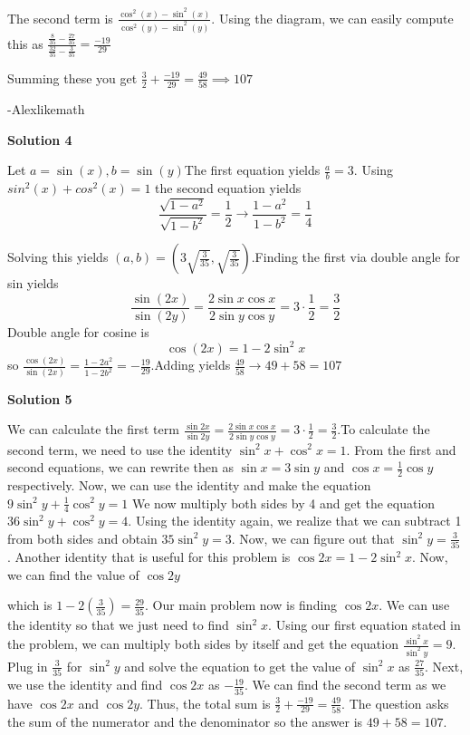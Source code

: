 \begin{enumerate}
 The second term is $\frac{\cos^2(x) - \sin^2(x)}{\cos^2(y) - \sin^2(y)}$. Using the diagram, we can easily compute this as $\frac{\frac{8}{35} - \frac{27}{35}}{\frac{32}{35} - \frac{3}{35}} = \frac{-19}{29}$

 Summing these you get $\frac{3}{2} + \frac{-19}{29} = \frac{49}{58} \implies \boxed{107}$

 -Alexlikemath

 



\textbf{Solution 4}

Let $a = \sin(x), b = \sin(y)$The first equation yields $\frac{a}{b} = 3.$ Using $sin^2(x) + cos^2(x) = 1$ the second equation yields 
 \[\frac{\sqrt{1-a^2}}{\sqrt{1-b^2}} = \frac{1}{2} \rightarrow \frac{1-a^2}{1-b^2} = \frac{1}{4}\]

 Solving this yields $\left(a, b\right) = \left(3\sqrt{\frac{3}{35}},\sqrt{\frac{3}{35}}\right).$Finding the first via double angle for sin yields
 \[\frac{\sin(2x)}{\sin(2y)} = \frac{2\sin{x}\cos{x}}{2\sin{y}\cos{y}} = 3 \cdot \frac{1}{2} = \frac{3}{2}\]Double angle for cosine is 
 \[\cos(2x) = 1-2\sin^2{x}\]so $\frac{\cos(2x)}{\sin(2x)} = \frac{1-2a^2}{1-2b^2} = -\frac{19}{29}.$Adding yields $\frac{49}{58} \rightarrow 49 + 58 = \boxed{107}$




\textbf{Solution 5}

We can calculate the first term $\frac{\sin 2x}{\sin 2y} = \frac{2 \sin x \cos x}{2 \sin y \cos y} = 3 \cdot \frac{1}{2} = \frac{3}{2}.$To calculate the second term, we need to use the identity $\sin^2 x + \cos^2 x = 1.$ From the first and second equations, we can rewrite then as $\sin x = 3 \sin y$ and $\cos x = \frac{1}{2} \cos y$ respectively. Now, we can use the identity and make the equation $9 \sin^2 y + \frac{1}{4} \cos^2 y = 1$ We now multiply both sides by 4 and get the equation $36 \sin^2 y + \cos^2 y = 4.$ Using the identity again, we realize that we can subtract 1 from both sides and obtain $35 \sin^2 y = 3$. Now, we can figure out that $\sin^2 y = \frac{3}{35}$. Another identity that is useful for this problem is $\cos 2x = 1 - 2 \sin^2 x$. Now, we can find the value of $\cos 2y$ 

 which is $1 - 2(\frac{3}{35}) = \frac{29}{35}$. Our main problem now is finding $\cos 2x$. We can use the identity so that we just need to find $\sin^2 x$. Using our first equation stated in the problem, we can multiply both sides by itself and get the equation $\frac{\sin^2 x}{\sin^2 y} = 9$. Plug in $\frac{3}{35}$ for $\sin^2 y$ and solve the equation to get the value of $\sin^2 x$ as $\frac{27}{35}$. Next, we use the identity and find $\cos 2x$ as $-\frac{19}{35}$. We can find the second term as we have $\cos 2x$ and $\cos 2y$. Thus, the total sum is $\frac{3}{2} + \frac{-19}{29} = \frac{49}{58}$. The question asks the sum of the numerator and the denominator so the answer is $49 + 58 = \boxed{107}$.


\end{enumerate}
